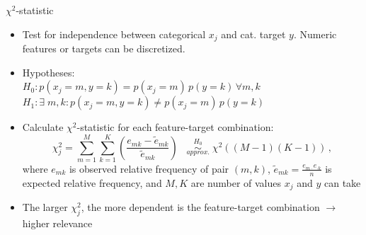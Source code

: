 \documentclass[11pt,compress,t,notes=noshow, xcolor=table]{beamer}
\begin{document}
  \begin{framev}{$\chi^2$-statistic}
  \begin{itemize}
    \item Test for independence between categorical $x_j$ and cat. target $y$. Numeric features or targets can be discretized.
    \item Hypotheses: \\
    $H_0: p(x_j = m, y = k) = p(x_j = m)\, p(y = k) \,\forall m, k$\\


    $H_1: \exists \; m, k: p(x_j = m, y = k) \neq p(x_j = m)\, p(y = k)$
    \item Calculate $\chi^2$-statistic for each feature-target combination:
      $$ \chi_j^2 = \sum_{m = 1}^{M} \sum_{k=1}^{K} (\frac{e_{mk} - \tilde{e}_{mk}}{\tilde{e}_{mk}}) \;\;\;   \stackrel{H_0}{\underset{approx.}{\sim}} \; \chi^2 ((M-1)(K-1))\,,$$
    where $e_{mk}$ is observed relative frequency of pair $(m,k)$, $\tilde{e}_{mk} = \frac{e_{m \cdot} e_{\cdot k}}{n}$ is expected relative frequency, and $M,K$ are number of values $x_j$ and $y$ can take
    \item The larger $\chi_j^2$, the more dependent is the feature-target combination $\rightarrow$ higher relevance
  \end{itemize}
  \end{framev}
\end{document}
